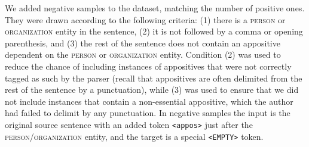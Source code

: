 \documentclass[11pt]{article}
\newcommand{\yktodo}[1]{\todo[color=green!20]{#1}}
\newcommand{\jttodo}[1]{\todo[color=blue!20]{#1}}
\begin{document}
We added negative samples to the dataset, matching the number of positive ones. They were drawn according to the following criteria: (1) there is a \textsc{person} or \textsc{organization} entity in the sentence, (2) it is not followed by a comma or opening parenthesis, and (3) the rest of the sentence does not contain an appositive dependent on the \textsc{person} or \textsc{organization} entity. Condition (2) was used to reduce the chance of including instances of appositives that were not correctly tagged as such by the parser (recall that appositives are often delimited from the rest of the sentence by a punctuation), while (3) was used to ensure that we did not include instances that contain a non-essential appositive, which the author had failed to delimit by any punctuation. In negative samples the input is the original source sentence with an added token \texttt{<appos>} just after the \textsc{person}/\textsc{organization} entity, and the target is a special \texttt{<EMPTY>} token. 


\end{document}
